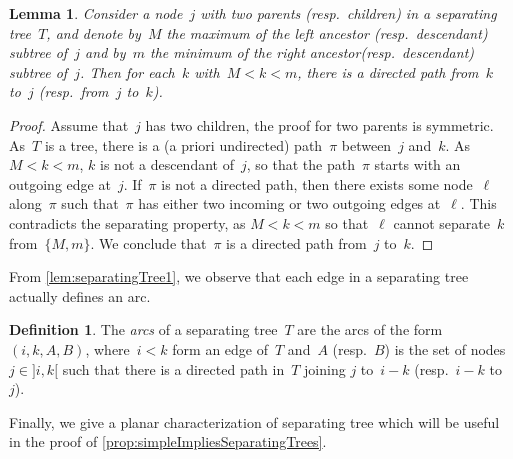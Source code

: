 \documentclass{amsart}
\newtheorem{corollary}[theorem]{Corollary}
\newtheorem{lemma}[theorem]{Lemma}
\theoremstyle{definition}
\newtheorem{definition}[theorem]{Definition}
\newcommand{\darkblue}{\color{darkblue}} %
\newcommand{\defn}[1]{\textsl{\darkblue #1}} %
\begin{document}
\begin{lemma}
\label{lem:separatingTree3}
Consider a node~$j$ with two parents (resp.~children) in a separating tree~$T$, and denote by~$M$ the maximum of the left ancestor (resp.~descendant) subtree of~$j$ and by~$m$ the minimum of the right ancestor(resp.~descendant) subtree of~$j$. Then for each~$k$ with~$M < k < m$, there is a directed path from~$k$ to~$j$ (resp.~from~$j$ to~$k$).
\end{lemma}

\begin{proof}
Assume that~$j$ has two children, the proof for two parents is symmetric.
As~$T$ is a tree, there is a (a priori undirected) path~$\pi$ between~$j$ and~$k$.
As~$M < k < m$, $k$ is not a descendant of~$j$, so that the path~$\pi$ starts with an outgoing edge at~$j$.
If~$\pi$ is not a directed path, then there exists some node~$\ell$ along~$\pi$ such that~$\pi$ has either two incoming or two outgoing edges at~$\ell$.
This contradicts the separating property, as $M < k < m$ so that~$\ell$ cannot separate~$k$ from~$\{M,m\}$.
We conclude that~$\pi$ is a directed path from~$j$ to~$k$.
\end{proof}

From \cref{lem:separatingTree1}, we observe that each edge in a separating tree actually defines an arc.

\begin{definition}
\label{def:arcsSeparatingTree}
The \defn{arcs} of a separating tree~$T$ are the arcs of the form~$(i, k, A, B)$, where~$i < k$ form an edge of~$T$ and~$A$ (resp.~$B$) is the set of nodes~$j \in {]i,k[}$ such that there is a directed path in~$T$ joining $j$ to~$i-k$ (resp.~$i-k$ to~$j$).
\end{definition}


Finally, we give a planar characterization of separating tree which will be useful in the proof of \cref{prop:simpleImpliesSeparatingTrees}.
\end{document}
